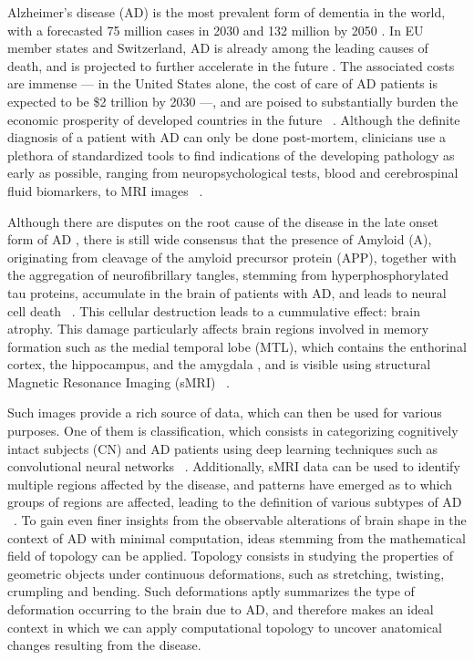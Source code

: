 \documentclass{article}
\begin{document}
Alzheimer's disease (AD) is the most prevalent form of dementia in the world, with a forecasted 75
million cases in 2030 and 132 million by 2050 \citep{world2017global}. In EU member states and
Switzerland, AD is already among the leading causes of death, and is projected to further accelerate
in the future \citep{sleeman2019escalating}. The associated costs are immense --- in the United
States alone, the cost of care of AD patients is expected to be \$2 trillion by 2030 ---, and are
poised to substantially burden the economic prosperity of developed countries in the future
~\citep{world2017global}. Although the definite diagnosis of a patient with AD can only be done
post-mortem, clinicians use a plethora of standardized tools to find indications of the developing
pathology as early as possible, ranging from neuropsychological tests, blood and cerebrospinal fluid
biomarkers, to MRI images ~\citep{mckhann2011diagnosis, smits2012early, lehmann2016biomarkers}.

Although there are disputes on the root cause of the disease in the late onset form of AD
\citep{tharp2013origins, fulop2018can, hur2020innate}, there is still wide consensus that the
presence of Amyloid \textbeta{} (A\textbeta{}), originating from cleavage of the amyloid precursor
protein (APP), together with the aggregation of neurofibrillary tangles, stemming from
hyperphosphorylated tau proteins, accumulate in the brain of patients with AD, and leads to neural
cell death ~\citep{da2016insights}. This cellular destruction leads to a cummulative effect: brain
atrophy. This damage particularly affects brain regions involved in memory formation such as the
medial temporal lobe (MTL), which contains the enthorinal cortex, the hippocampus, and the amygdala
\citep{goedert2006century}, and is visible using structural Magnetic Resonance Imaging (sMRI)
~\citep{frisoni2010clinical}.

Such images provide a rich source of data, which can then be used for various
purposes. One of them is classification, which consists in categorizing
cognitively intact subjects (CN) and AD patients using deep learning techniques
such as convolutional neural networks ~\citep{wen2020convolutional}.
Additionally, sMRI data can be used to identify multiple regions affected by the
disease, and patterns have emerged as to which groups of regions are affected,
leading to the definition of various subtypes of AD
~\citep{poulakis2018heterogeneous,tijms2020pathophysiological}. To gain even
finer insights from the observable alterations of brain shape in the context of
AD with minimal computation, ideas stemming from the mathematical field of
topology can be applied. Topology consists in studying the properties of
geometric objects under continuous deformations, such as stretching, twisting,
crumpling and bending. Such deformations aptly summarizes the type of
deformation occurring to the brain due to AD, and therefore makes an ideal
context in which we can apply computational topology to uncover anatomical
changes resulting from the disease.
\end{document}
